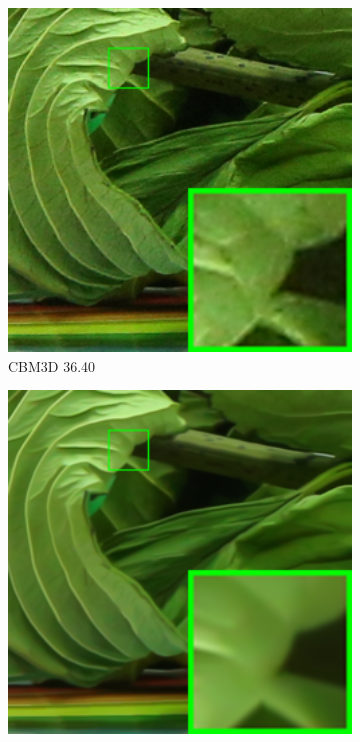 \begin{figure}
\begin{subfigure}[t]{0.19\textwidth}
        \includegraphics[width=1\textwidth]{images/guided/cc15/resize_br_CBM3D_5dmark3_iso3200_2_real.png}
		\caption{CBM3D 36.40}
    \end{subfigure}
    \hfill
    \begin{subfigure}[t]{0.19\textwidth}
        \centering
        \includegraphics[width=1\textwidth]{images/guided/cc15/resize_br_WNNM_5dmark3_iso3200_2_real.png}

\end{subfigure}
\end{figure}
